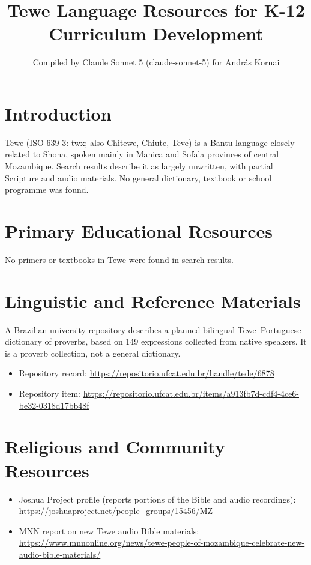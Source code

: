 \documentclass[12pt]{article}
\title{Tewe Language Resources for K-12 Curriculum Development}
\author{Compiled by Claude Sonnet 5 (claude-sonnet-5) for Andr\'as Kornai}
\date{}
\begin{document}
\maketitle

\section{Introduction}
Tewe (ISO 639-3: twx; also Chitewe, Chiute, Teve) is a Bantu language closely related to Shona, spoken mainly in Manica and Sofala provinces of central Mozambique. Search results describe it as largely unwritten, with partial Scripture and audio materials. No general dictionary, textbook or school programme was found.

\section{Primary Educational Resources}
No primers or textbooks in Tewe were found in search results.

\section{Linguistic and Reference Materials}
A Brazilian university repository describes a planned bilingual Tewe--Portuguese dictionary of proverbs, based on 149 expressions collected from native speakers. It is a proverb collection, not a general dictionary.
\begin{itemize}
\item Repository record: \url{https://repositorio.ufcat.edu.br/handle/tede/6878}
\item Repository item: \url{https://repositorio.ufcat.edu.br/items/a913fb7d-cdf4-4ce6-be32-0318d17bb48f}
\end{itemize}

\section{Religious and Community Resources}
\begin{itemize}
\item Joshua Project profile (reports portions of the Bible and audio recordings): \url{https://joshuaproject.net/people_groups/15456/MZ}
\item MNN report on new Tewe audio Bible materials: \url{https://www.mnnonline.org/news/tewe-people-of-mozambique-celebrate-new-audio-bible-materials/}
\end{itemize}
\end{document}
